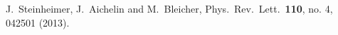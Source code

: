 \documentclass[aps,prc,nofootinbib,showpacs,superscriptaddress,groupedaddress]{revtex4-1}
\begin{document}
\begin{thebibliography}{99}
  J.~Steinheimer, J.~Aichelin and M.~Bleicher,
  Phys.\ Rev.\ Lett.\  {\bf 110}, no. 4, 042501 (2013).
  

\end{thebibliography}
\end{document}

